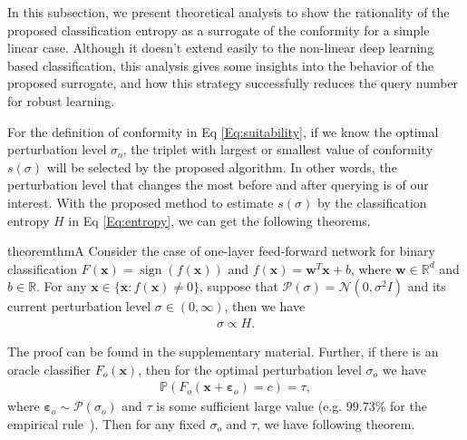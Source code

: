 \documentclass[letterpaper]{article} %
\begin{document}
In this subsection, we present theoretical analysis to show the rationality of the proposed classification entropy as a surrogate of the conformity for a simple linear case. Although it doesn't extend easily to the non-linear deep learning based classification, this analysis gives some insights into the behavior of the proposed surrogate, and how this strategy successfully reduces the query number for robust learning.

For the definition of conformity in Eq \ref{Eq:suitability}, if we know the optimal perturbation level $\sigma_o$, the triplet with largest or smallest value of conformity $s(\sigma)$  will be selected by the proposed algorithm. In other words, the perturbation level that changes the most before and after querying is of our interest. With the proposed method to estimate $s(\sigma)$ by the classification entropy $H$ in Eq \ref{Eq:entropy}, we can get the following theorems.

\begin{restatable}[]{theorem}{thmA}
	\label{theorem:thmA}
	Consider the case of one-layer feed-forward network for binary classification $F(\mathbf{x}) = \operatorname{sign}(f(\mathbf{x}))$ and $f(\mathbf{x}) = \mathbf{w}^T \mathbf{x} + b$, where $\mathbf{w} \in \mathbb{R}^d$ and $b \in \mathbb{R}$.
	For any $\mathbf{x} \in \{\mathbf{x}: f(\mathbf{x}) \neq 0\}$, suppose that $\mathcal{P}(\sigma) = \mathcal{N}(0, \sigma^{2} I)$ and its current perturbation level $\sigma \in (0, \infty)$, then we have
	\begin{align}
	\sigma \propto H.
	\end{align}
\end{restatable}

The proof can be found in the supplementary material. Further, if there is an oracle classifier $F_o(\mathbf{x})$, then for the optimal perturbation level $\sigma_o$ we have
\begin{align}
\mathbb{P}(F_o(\mathbf{x}+\boldsymbol{\varepsilon}_o) = c) = \tau, 
\end{align}
where $\boldsymbol{\varepsilon}_o  \sim \mathcal{P}(\sigma_o)$ and $\tau$ is some sufficient large value (e.g. $99.73\%$ for the empirical rule~\cite{pukelsheim1994three}). Then for any fixed $\sigma_o$ and $\tau$, we have following theorem.
\end{document}
